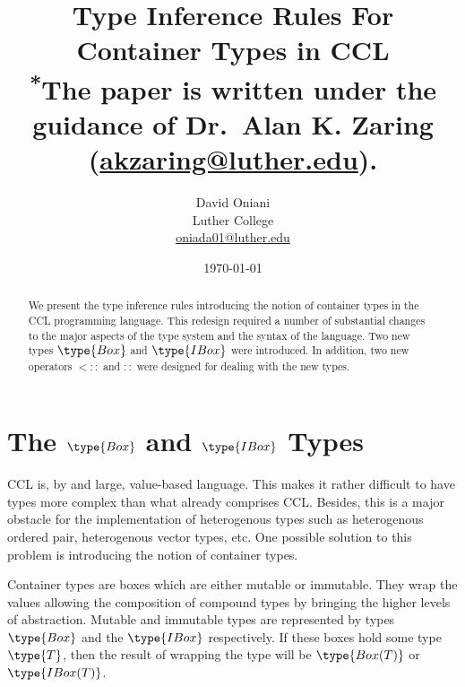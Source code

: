 \documentclass{article}
\author{David Oniani\\
        Luther College\\
        \href{mailto:oniada01@luther.edu}{oniada01@luther.edu}}
\title{\textbf{Type Inference Rules For Container Types in CCL}\\
       \medskip
       \small \textsuperscript{*}The paper is written under the guidance of
       Dr.\ Alan K. Zaring
       (\href{mailto:akzaring@luther.edu}{akzaring@luther.edu}).}
\date{\today}
\newcommand\ltypeof{\mathrel{::}}
\newcommand\subtypecont{\mathrel{<::}}
\begin{document}
\maketitle


\begin{abstract}
\noindent We present the type inference rules introducing the notion of
container types in the CCL programming language. This redesign required a
number of substantial changes to the major aspects of the type system and the
syntax of the language. Two new types $\type{Box}$ and $\type{IBox}$ were
introduced. In addition, two new operators $\subtypecont$ and $\ltypeof$ were
designed for dealing with the new types.
\end{abstract}



\section*{The $\type{Box}$ and $\type{IBox}$ Types}

CCL is, by and large, value-based language. This makes it rather difficult to
have types more complex than what already comprises CCL. Besides, this is a
major obstacle for the implementation of heterogenous types such as
heterogenous ordered pair, heterogenous vector types, etc. One possible
solution to this problem is introducing the notion of container types.

\medskip

Container types are boxes which are either mutable or immutable. They wrap the
values allowing the composition of compound types by bringing the higher levels
of abstraction. Mutable and immutable types are represented by types
$\type{Box}$ and the $\type{IBox}$ respectively. If these boxes hold some type
$\type{T}$, then the result of wrapping the type will be $\type{Box(T)}$ or
$\type{IBox(T)}$.

\end{document}
